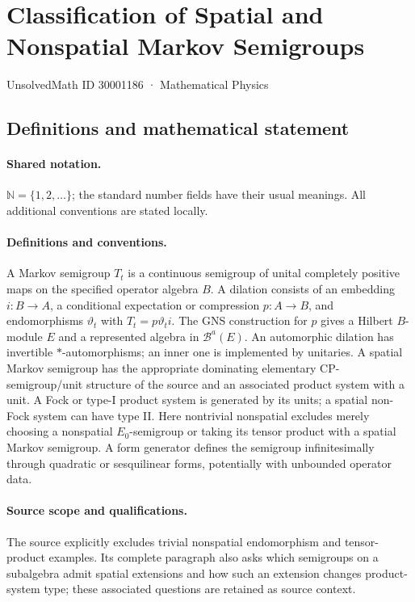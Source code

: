 \documentclass[11pt]{article}
\begin{document}
\setcounter{section}{30001185}
\section{Classification of Spatial and Nonspatial Markov Semigroups}\label{30001186}
{\small UnsolvedMath ID 30001186 · Mathematical Physics}
\subsection{Definitions and mathematical statement}

\paragraph{Shared notation.}$\mathbb N=\{1,2,\ldots\}$; the standard number fields have their usual meanings. All additional conventions are stated locally.


\paragraph{Definitions and conventions.} A Markov semigroup $T_t$ is a continuous semigroup of unital completely positive maps on the specified operator algebra $B$. A dilation consists of an embedding $i:B\to A$, a conditional expectation or compression $p:A\to B$, and endomorphisms $\vartheta_t$ with $T_t=p\vartheta_t i$. The GNS construction for $p$ gives a Hilbert $B$-module $E$ and a represented algebra in $\mathcal B^a(E)$. An automorphic dilation has invertible $*$-automorphisms; an inner one is implemented by unitaries. A spatial Markov semigroup has the appropriate dominating elementary CP-semigroup/unit structure of the source and an associated product system with a unit. A Fock or type-I product system is generated by its units; a spatial non-Fock system can have type II. Here nontrivial nonspatial excludes merely choosing a nonspatial $E_0$-semigroup or taking its tensor product with a spatial Markov semigroup. A form generator defines the semigroup infinitesimally through quadratic or sesquilinear forms, potentially with unbounded operator data.

\paragraph{Source scope and qualifications.} The source explicitly excludes trivial nonspatial endomorphism and tensor-product examples. Its complete paragraph also asks which semigroups on a subalgebra admit spatial extensions and how such an extension changes product-system type; these associated questions are retained as source context.
\end{document}
